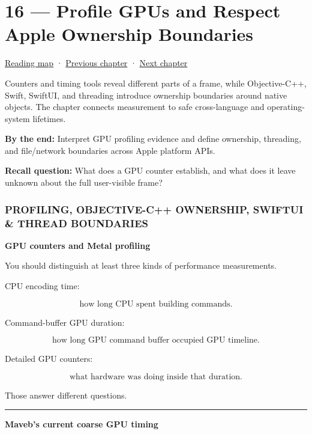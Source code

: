 \hypertarget{01-foundations-i-ch016}{}
\section{16 --- Profile GPUs and Respect Apple Ownership Boundaries}\label{profile-gpus-and-respect-apple-ownership-boundaries}

\href{Chapter\%20Edition/01\%20-\%20Computing\%20Foundations/00\%20-\%20Reading\%20Map}{Reading map} · \hyperref[01-foundations-i-ch015]{Previous chapter} · \hyperref[01-foundations-i-ch017]{Next chapter}

Counters and timing tools reveal different parts of a frame, while Objective-C++, Swift, SwiftUI, and threading introduce ownership boundaries around native objects. The chapter connects measurement to safe cross-language and operating-system lifetimes.

\textbf{By the end:} Interpret GPU profiling evidence and define ownership, threading, and file/network boundaries across Apple platform APIs.

\textbf{Recall question:} What does a GPU counter establish, and what does it leave unknown about the full user-visible frame?

\subsubsection{PROFILING, OBJECTIVE-C++ OWNERSHIP, SWIFTUI \& THREAD BOUNDARIES}\label{profiling-objective-c-ownership-swiftui-thread-boundaries}

\textbf{GPU counters and Metal profiling}

You should distinguish at least three kinds of performance measurements.

CPU encoding time:

\[
\text{how long CPU spent building commands}.
\]

Command-buffer GPU duration:

\[
\text{how long GPU command buffer occupied GPU timeline}.
\]

Detailed GPU counters:

\[
\text{what hardware was doing inside that duration}.
\]

Those answer different questions.

\begin{center}\rule{0.5\linewidth}{0.5pt}\end{center}

\textbf{Maveb's current coarse GPU timing}


